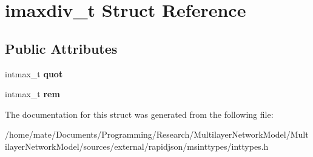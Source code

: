 \hypertarget{structimaxdiv__t}{}\section{imaxdiv\+\_\+t Struct Reference}
\label{structimaxdiv__t}
\subsection*{Public Attributes}
\begin{DoxyCompactItemize}
\item 
intmax\+\_\+t {\bfseries quot}\hypertarget{structimaxdiv__t_a9339814cbb7610c72fb7d30c6573b393}{}\label{structimaxdiv__t_a9339814cbb7610c72fb7d30c6573b393}

\item 
intmax\+\_\+t {\bfseries rem}\hypertarget{structimaxdiv__t_a6c9701ad10bff81edae7ff679cae7850}{}\label{structimaxdiv__t_a6c9701ad10bff81edae7ff679cae7850}

\end{DoxyCompactItemize}


The documentation for this struct was generated from the following file\+:\begin{DoxyCompactItemize}
\item 
/home/mate/\+Documents/\+Programming/\+Research/\+Multilayer\+Network\+Model/\+Multilayer\+Network\+Model/sources/external/rapidjson/msinttypes/inttypes.\+h\end{DoxyCompactItemize}
